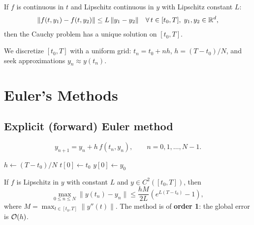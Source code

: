\begin{theorem}
\label{thm:picard}
If $f$ is continuous in $t$ and Lipschitz continuous in $y$ with Lipschitz constant $L$:
\[
    \|f(t,y_1) - f(t,y_2)\| \leq L\,\|y_1 - y_2\| \quad \forall\, t \in [t_0, T],\; y_1, y_2 \in \mathbb{R}^d,
\]
then the Cauchy problem has a unique solution on $[t_0, T]$.
\end{theorem}

We discretize $[t_0, T]$ with a uniform grid: $t_n = t_0 + nh$, $h = (T-t_0)/N$, and seek approximations $y_n \approx y(t_n)$.

\section{Euler's Methods}

\subsection{Explicit (forward) Euler method}

\begin{definition}
\label{def:euler-explicit}
\[
    y_{n+1} = y_n + h\,f(t_n, y_n), \qquad n = 0, 1, \ldots, N-1.
\]
\end{definition}

\begin{algorithm}[H]
\caption{Explicit Euler method}
\label{alg:euler-explicit}
$h \gets (T - t_0) / N$\;
$t[0] \gets t_0$\;
$y[0] \gets y_0$\;
\;
\end{algorithm}

\begin{theorem}
\label{thm:euler-error}
If $f$ is Lipschitz in $y$ with constant $L$ and $y \in C^2([t_0,T])$, then
\[
    \max_{0 \leq n \leq N} \|y(t_n) - y_n\| \leq \frac{hM}{2L}\left(e^{L(T-t_0)} - 1\right),
\]
where $M = \max_{t \in [t_0,T]} \|y''(t)\|$. The method is of \textbf{order 1}: the global error is $\mathcal{O}(h)$.
\end{theorem}

